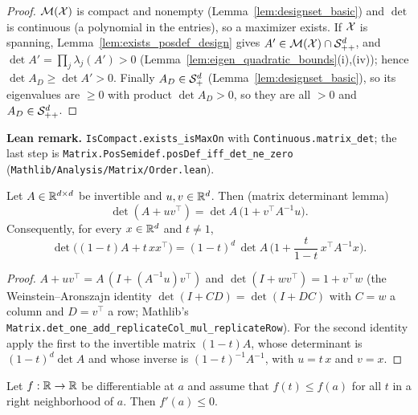 \begin{proof}
\leanok
{}
$\mathcal{M}(\mathcal{X})$ is compact and nonempty (Lemma~\ref{lem:designset_basic}) and $\det$ is
continuous (a polynomial in the entries), so a maximizer exists. If $\mathcal{X}$ is spanning,
Lemma~\ref{lem:exists_posdef_design} gives $A' \in \mathcal{M}(\mathcal{X}) \cap \mathcal{S}_{++}^{d}$, and
$\det A' = \prod_j \lambda_j(A') > 0$ (Lemma~\ref{lem:eigen_quadratic_bounds}(i),(iv)); hence
$\det A_D \ge \det A' > 0$. Finally $A_D \in \mathcal{S}_{+}^{d}$ (Lemma~\ref{lem:designset_basic}), so its
eigenvalues are $\ge 0$ with product $\det A_D > 0$, so they are all $> 0$ and $A_D \in \mathcal{S}_{++}^{d}$.
\end{proof}

\textbf{Lean remark.} \texttt{IsCompact.exists\_isMaxOn} with \texttt{Continuous.matrix\_det};
the last step is \texttt{Matrix.PosSemidef.posDef\_iff\_det\_ne\_zero}
(\texttt{Mathlib/Analysis/Matrix/Order.lean}).

\begin{lemma}\label{lem:det_rank_one_mix}
\leanok
Let $A \in \mathbb{R}^{d\times d}$ be invertible and $u, v \in \mathbb{R}^d$. Then (matrix determinant lemma)
\[
  \det(A + uv^\top) = \det A\,\big(1 + v^\top A^{-1} u\big) .
\]
Consequently, for every $x \in \mathbb{R}^d$ and $t \ne 1$,
\[
  \det\big((1-t)A + t\,xx^\top\big) = (1-t)^d\,\det A\,\Big(1 + \frac{t}{1-t}\,x^\top A^{-1}x\Big) .
\]
\end{lemma}

\begin{proof}
\leanok
$A + uv^\top = A\,(I + (A^{-1}u)v^\top)$ and $\det(I + wv^\top) = 1 + v^\top w$ (the
Weinstein--Aronszajn identity $\det(I + CD) = \det(I + DC)$ with $C = w$ a column and $D = v^\top$
a row; Mathlib's \texttt{Matrix.det\_one\_add\_replicateCol\_mul\_replicateRow}). For the second
identity apply the first to the invertible matrix $(1-t)A$, whose determinant is $(1-t)^d\det A$
and whose inverse is $(1-t)^{-1}A^{-1}$, with $u = t\,x$ and $v = x$.
\end{proof}

\begin{lemma}\label{lem:deriv_nonpos_right_max}
\leanok
Let $f : \mathbb{R} \to \mathbb{R}$ be differentiable at $a$ and assume that $f(t) \le f(a)$ for all $t$ in a
right neighborhood of $a$. Then $f'(a) \le 0$.
\end{lemma}


